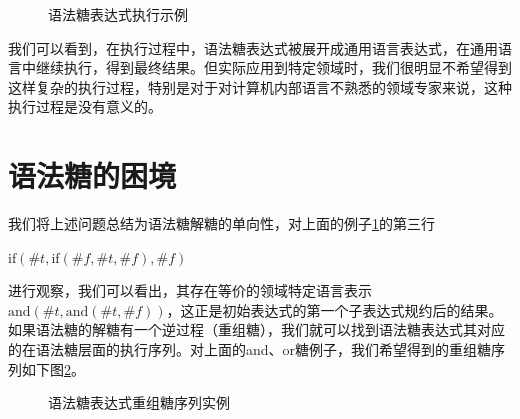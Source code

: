 \begin{figure}[ht]
\caption{语法糖表达式执行示例}
\label{fig:desugar}
\end{figure}



我们可以看到，在执行过程中，语法糖表达式被展开成通用语言表达式，在通用语言中继续执行，得到最终结果。但实际应用到特定领域时，我们很明显不希望得到这样复杂的执行过程，特别是对于对计算机内部语言不熟悉的领域专家来说，这种执行过程是没有意义的。


\section{语法糖的困境}
\label{mark:onedirect}我们将上述问题总结为语法糖解糖的单向性，对上面的例子\ref{fig:desugar}的第三行

\begin{flushleft}
	$\mbox{if}(\#t , \mbox{if}(\#f, \#t, \#f), \#f)$
\end{flushleft}
进行观察，我们可以看出，其存在等价的领域特定语言表示$\mbox{and}(\#t, \mbox{and}(\#t, \#f))$，这正是初始表达式的第一个子表达式规约后的结果。如果语法糖的解糖有一个逆过程（重组糖），我们就可以找到语法糖表达式其对应的在语法糖层面的执行序列。对上面的and、or糖例子，我们希望得到的重组糖序列如下图\ref{fig:resugar}。

\begin{figure}[ht]
	\caption{语法糖表达式重组糖序列实例}
	\label{fig:resugar}
\end{figure}

